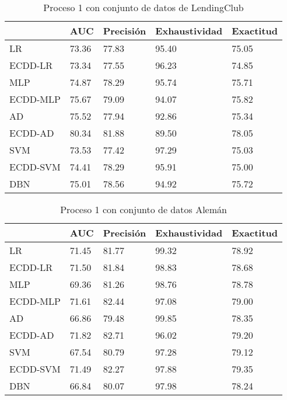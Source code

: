 \begin{table}[]
\centering
\caption{Proceso 1 con conjunto de datos de LendingClub}
\label{tab:lc-proc1}
\begin{tabularx}{0.75\textwidth}{|l|Y Y Y Y|}
                \hline
                & AUC       & Precisión & Exhaustividad    & Exactitud  \\
                \hline
LR              & 73.36     & 77.83     & 95.40     & 75.05		\\
ECDD-LR           & 73.34     & 77.55     & 96.23     & 74.85		\\
                \hline
MLP             & 74.87     & 78.29     & 95.74     & 75.71		\\
ECDD-MLP          & 75.67     & 79.09     & 94.07     & 75.82		\\
                \hline
AD              & 75.52     & 77.94     & 92.86     & 75.34		\\
ECDD-AD           & 80.34     & 81.88     & 89.50     & 78.05		\\
                \hline
SVM             & 73.53     & 77.42     & 97.29     & 75.03		\\
ECDD-SVM          & 74.41     & 78.29     & 95.91     & 75.00		\\
                \hline
DBN             & 75.01     & 78.56     & 94.92     & 75.72		\\
                \hline
\end{tabularx}
\end{table}


\begin{table}[]
\centering
\caption{Proceso 1 con conjunto de datos Alemán}
\label{tab:german-proc1}
\begin{tabularx}{0.75\textwidth}{|l|Y Y Y Y|}
                \hline
                & AUC       & Precisión & Exhaustividad    & Exactitud  \\
                \hline
LR              & 71.45     & 81.77     & 99.32     & 78.92     \\
ECDD-LR           & 71.50     & 81.84     & 98.83     & 78.68     \\
                \hline
MLP             & 69.36     & 81.26     & 98.76     & 78.78     \\
ECDD-MLP          & 71.61     & 82.44     & 97.08     & 79.00     \\
                \hline
AD              & 66.86     & 79.48     & 99.85     & 78.35     \\
ECDD-AD           & 71.82     & 82.71     & 96.02     & 79.20     \\
                \hline
SVM             & 67.54     & 80.79     & 97.28     & 79.12     \\
ECDD-SVM          & 71.49     & 82.27     & 97.88     & 79.35     \\
                \hline
DBN             & 66.84     & 80.07     & 97.98     & 78.24     \\
                \hline
\end{tabularx}
\end{table}



